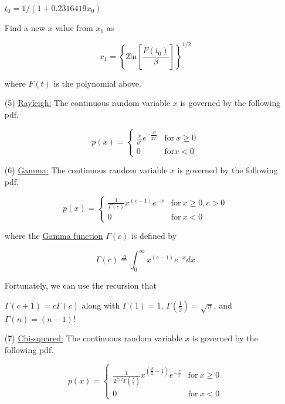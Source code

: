 \documentclass[fleqn]{article}
\begin{document}
\begin{enumerate}
		$t_0 = 1/(1 + 0.2316419x_0)$
		
		Find a new $x$ value from $x_0$ as
		
		\begin{equation*}
			x_1 = \left\{2\text{ln}\left[\frac{F(t_0)}{\beta}\right]\right\}^{1/2}
		\end{equation*}
		
		where $F(t)$ is the polynomial above.
		
		\item[(5)] \underline{Rayleigh:} The continuous random variable $x$ is governed by the following pdf.
		
		\begin{equation*}
			p(x) = \begin{cases}
				\frac{x}{b^2}e^{-\frac{x^2}{2b^2}} & \text{for}\ x \geq 0\\
				0 & \text{for} x < 0
			\end{cases}
		\end{equation*}
		
		\item[(6)] \underline{Gamma:} The continuous random variable $x$ is governed by the following pdf.
		
		\begin{equation*}
			p(x) = \begin{cases}
				\frac{1}{\Gamma(c)}x^{(c-1)}e^{-x} & \text{for}\ x \geq 0, c > 0\\
				0 & \text{for}\ x < 0
			\end{cases}
		\end{equation*}
		
		where the \underline{Gamma function} $\Gamma(c)$ is defined by
		
		\begin{equation*}
			\Gamma(c) \overset{\Delta}{=} \int_0^{\infty}x^{(c-1)}e^{-x}dx
		\end{equation*}
		
		Fortunately, we can use the recursion that
		
		$\Gamma(c+1) = c\Gamma(c)$ along with $\Gamma(1) = 1$, $\Gamma(\frac{1}{2}) = \sqrt{\pi}$, and $\Gamma(n) = (n-1)!$
		
		\item[(7)] \underline{Chi-squared:} The continuous random variable $x$ is governed by the following pdf.
		
		\begin{equation*}
			p(x) = \begin{cases}
				\frac{1}{2^{\beta/2}\Gamma\left(\frac{\beta}{2}\right)}x^{\left(\frac{\beta}{2} - 1\right)}e^{-\frac{x}{2}} & \text{for}\ x \geq 0\\
				0 & \text{for}\ x < 0
			\end{cases}
		\end{equation*}
		

\end{enumerate}
\end{document}
